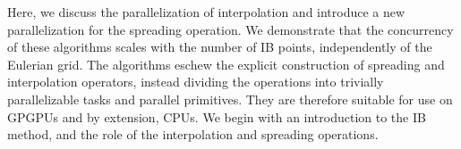 Here, we discuss the parallelization of interpolation and introduce a new parallelization
for the spreading operation. We demonstrate that the concurrency of these algorithms
scales with the number of IB points, independently of the Eulerian grid. The algorithms
eschew the explicit construction of spreading and interpolation operators, instead
dividing the operations into trivially parallelizable tasks and parallel primitives. They
are therefore suitable for use on GPGPUs and by extension, CPUs. We begin with an
introduction to the IB method, and the role of the interpolation and spreading
operations.

